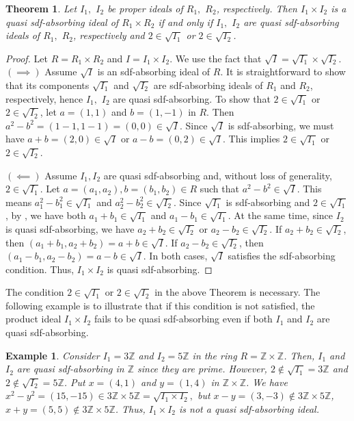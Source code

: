 \documentclass{amsart}%
\newtheorem{example}{Example}[section]
\newtheorem{theorem}{Theorem}[section]
\begin{document}
\begin{theorem}
Let $I_{1},$ $I_{2}$ be proper ideals of $R_{1},$ $R_{2}$, respectively. Then
$I_{1}\times I_{2}$ is a quasi sdf-absorbing ideal of $R_{1}\times R_{2}$ if
and only if $I_{1},$ $I_{2}$ are quasi sdf-absorbing ideals of $R_{1},$
$R_{2}$, respectively and $2\in\sqrt{I_{1}}$ or $2\in\sqrt{I_{2}}$.
\end{theorem}

\begin{proof}
Let $R=R_{1}\times R_{2}$ and $I=I_{1}\times I_{2}$. We use the fact that
$\sqrt{I}=\sqrt{I_{1}}\times\sqrt{I_{2}}$. $(\implies)$ Assume $\sqrt{I}$ is
an sdf-absorbing ideal of $R$. It is straightforward to show that its
components $\sqrt{I_{1}}$ and $\sqrt{I_{2}}$ are sdf-absorbing ideals of
$R_{1}$ and $R_{2}$, respectively, hence $I_{1},$ $I_{2}$ are quasi
sdf-absorbing. To show that $2\in\sqrt{I_{1}}$ or $2\in\sqrt{I_{2}}$, let
$a=(1,1)$ and $b=(1,-1)$ in $R$. Then $a^{2}-b^{2}=(1-1,1-1)=(0,0)\in\sqrt{I}%
$. Since $\sqrt{I}$ is sdf-absorbing, we must have $a+b=(2,0)\in\sqrt{I}$ or
$a-b=(0,2)\in\sqrt{I}$. This implies $2\in\sqrt{I_{1}}$ or $2\in\sqrt{I_{2}}$.

$(\impliedby)$ Assume $I_{1},I_{2}$ are quasi sdf-absorbing and, without loss
of generality, $2\in\sqrt{I_{1}}$. Let $a=(a_{1},a_{2}),b=(b_{1},b_{2})\in R$
such that $a^{2}-b^{2}\in\sqrt{I}$. This means $a_{1}^{2}-b_{1}^{2}\in
\sqrt{I_{1}}$ and $a_{2}^{2}-b_{2}^{2}\in\sqrt{I_{2}}$. Since $\sqrt{I_{1}}$
is sdf-absorbing and $2\in\sqrt{I_{1}}$, by \cite[Theorem 2.5]{AB2024}, we
have both $a_{1}+b_{1}\in\sqrt{I_{1}}$ and $a_{1}-b_{1}\in\sqrt{I_{1}}$. At
the same time, since $I_{2}$ is quasi sdf-absorbing, we have $a_{2}+b_{2}%
\in\sqrt{I_{2}}$ or $a_{2}-b_{2}\in\sqrt{I_{2}}$. If $a_{2}+b_{2}\in
\sqrt{I_{2}}$, then $(a_{1}+b_{1},a_{2}+b_{2})=a+b\in\sqrt{I}$. If
$a_{2}-b_{2}\in\sqrt{I_{2}}$, then $(a_{1}-b_{1},a_{2}-b_{2})=a-b\in\sqrt{I}$.
In both cases, $\sqrt{I}$ satisfies the sdf-absorbing condition. Thus,
$I_{1}\times I_{2}$ is quasi sdf-absorbing.
\end{proof}

The condition $2\in\sqrt{I_{1}}$ or $2\in\sqrt{I_{2}}$ in the above Theorem is
necessary. The following example is to illustrate that if this condition is
not satisfied, the product ideal $I_{1}\times I_{2}$ fails to be quasi
sdf-absorbing even if both $I_{1}$ and $I_{2}$ are quasi sdf-absorbing.

\begin{example}
Consider $I_{1}=3\mathbb{Z}$ and $I_{2}=5\mathbb{Z}$ in the ring
$R=\mathbb{Z}\times\mathbb{Z}$. Then, $I_{1}$ and $I_{2}$ are quasi
sdf-absorbing in $\mathbb{Z}$ since they are prime. However, $2\notin
\sqrt{I_{1}}=3\mathbb{Z}$ and $2\notin\sqrt{I_{2}}=5\mathbb{Z}$. Put $x=(4,1)$
and $y=(1,4)$ in $\mathbb{Z}\times\mathbb{Z}$. We have $x^{2}-y^{2}%
=(15,-15)\in3\mathbb{Z}\times5\mathbb{Z}=\sqrt{I_{1}\times I_{2}},$ but
$x-y=(3,-3)\notin3\mathbb{Z}\times5\mathbb{Z}$, $x+y=(5,5)\notin
3\mathbb{Z}\times5\mathbb{Z}$. Thus, $I_{1}\times I_{2}$ is not a quasi
sdf-absorbing ideal.
\end{example}
\end{document}
